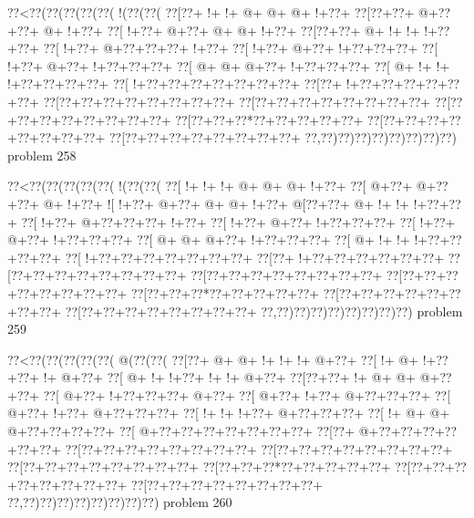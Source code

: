 \vbox{\vbox{\goo
\0??<\0??(\0??(\0??(\0??(\0??(\- !(\0??(\0??(
\0??[\0??+\- !+\- !+\- @+\- @+\- @+\- !+\0??+
\0??[\0??+\0??+\- @+\0??+\0??+\- @+\- !+\0??+
\0??[\- !+\0??+\- @+\0??+\- @+\- @+\- !+\0??+
\0??[\0??+\0??+\- @+\- !+\- !+\- !+\0??+\0??+
\0??[\- !+\0??+\- @+\0??+\0??+\0??+\- !+\0??+
\0??[\- !+\0??+\- @+\0??+\- !+\0??+\0??+\0??+
\0??[\- !+\0??+\- @+\0??+\- !+\0??+\0??+\0??+
\0??[\- @+\- @+\- @+\0??+\- !+\0??+\0??+\0??+
\0??[\- @+\- !+\- !+\- !+\0??+\0??+\0??+\0??+
\0??[\- !+\0??+\0??+\0??+\0??+\0??+\0??+\0??+
\0??[\0??+\- !+\0??+\0??+\0??+\0??+\0??+\0??+
\0??[\0??+\0??+\0??+\0??+\0??+\0??+\0??+\0??+
\0??[\0??+\0??+\0??+\0??+\0??+\0??+\0??+\0??+
\0??[\0??+\0??+\0??+\0??+\0??+\0??+\0??+\0??+
\0??[\0??+\0??+\0??*\0??+\0??+\0??+\0??+\0??+
\0??[\0??+\0??+\0??+\0??+\0??+\0??+\0??+\0??+
\0??[\0??+\0??+\0??+\0??+\0??+\0??+\0??+\0??+
\0??,\0??)\0??)\0??)\0??)\0??)\0??)\0??)\0??)
}
\hfil problem 258\hfil\break
}

\vbox{\vbox{\goo
\0??<\0??(\0??(\0??(\0??(\0??(\- !(\0??(\0??(
\0??[\- !+\- !+\- !+\- @+\- @+\- @+\- !+\0??+
\0??[\- @+\0??+\- @+\0??+\0??+\- @+\- !+\0??+
\- ![\- !+\0??+\- @+\0??+\- @+\- @+\- !+\0??+
\- @[\0??+\0??+\- @+\- !+\- !+\- !+\0??+\0??+
\0??[\- !+\0??+\- @+\0??+\0??+\0??+\- !+\0??+
\0??[\- !+\0??+\- @+\0??+\- !+\0??+\0??+\0??+
\0??[\- !+\0??+\- @+\0??+\- !+\0??+\0??+\0??+
\0??[\- @+\- @+\- @+\0??+\- !+\0??+\0??+\0??+
\0??[\- @+\- !+\- !+\- !+\0??+\0??+\0??+\0??+
\0??[\- !+\0??+\0??+\0??+\0??+\0??+\0??+\0??+
\0??[\0??+\- !+\0??+\0??+\0??+\0??+\0??+\0??+
\0??[\0??+\0??+\0??+\0??+\0??+\0??+\0??+\0??+
\0??[\0??+\0??+\0??+\0??+\0??+\0??+\0??+\0??+
\0??[\0??+\0??+\0??+\0??+\0??+\0??+\0??+\0??+
\0??[\0??+\0??+\0??*\0??+\0??+\0??+\0??+\0??+
\0??[\0??+\0??+\0??+\0??+\0??+\0??+\0??+\0??+
\0??[\0??+\0??+\0??+\0??+\0??+\0??+\0??+\0??+
\0??,\0??)\0??)\0??)\0??)\0??)\0??)\0??)\0??)
}
\hfil problem 259\hfil\break
}

\vbox{\vbox{\goo
\0??<\0??(\0??(\0??(\0??(\0??(\- @(\0??(\0??(
\0??[\0??+\- @+\- @+\- !+\- !+\- !+\- @+\0??+
\0??[\- !+\- @+\- !+\0??+\0??+\- !+\- @+\0??+
\0??[\- @+\- !+\- !+\0??+\- !+\- !+\- @+\0??+
\0??[\0??+\0??+\- !+\- @+\- @+\- @+\0??+\0??+
\0??[\- @+\0??+\- !+\0??+\0??+\0??+\- @+\0??+
\0??[\- @+\0??+\- !+\0??+\- @+\0??+\0??+\0??+
\0??[\- @+\0??+\- !+\0??+\- @+\0??+\0??+\0??+
\0??[\- !+\- !+\- !+\0??+\- @+\0??+\0??+\0??+
\0??[\- !+\- @+\- @+\- @+\0??+\0??+\0??+\0??+
\0??[\- @+\0??+\0??+\0??+\0??+\0??+\0??+\0??+
\0??[\0??+\- @+\0??+\0??+\0??+\0??+\0??+\0??+
\0??[\0??+\0??+\0??+\0??+\0??+\0??+\0??+\0??+
\0??[\0??+\0??+\0??+\0??+\0??+\0??+\0??+\0??+
\0??[\0??+\0??+\0??+\0??+\0??+\0??+\0??+\0??+
\0??[\0??+\0??+\0??*\0??+\0??+\0??+\0??+\0??+
\0??[\0??+\0??+\0??+\0??+\0??+\0??+\0??+\0??+
\0??[\0??+\0??+\0??+\0??+\0??+\0??+\0??+\0??+
\0??,\0??)\0??)\0??)\0??)\0??)\0??)\0??)\0??)
}
\hfil problem 260\hfil\break
}

